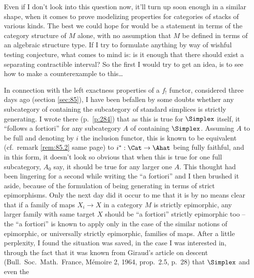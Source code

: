 Even if I don't look into this question now, it'll turn up soon enough
in a similar shape, when it comes to prove modelizing properties for
categories of stacks of various kinds. The best we could hope for
would be a statement in terms of the category structure of $M$ alone,
with no assumption that $M$ be defined in terms of an algebraic
structure type. If I try to formulate anything by way of wishful
testing conjecture, what comes to mind is: is it enough that there
should exist a separating contractible interval? So the first I would
try to get an idea, is to see how to make a counterexample to
this\ldots

\bigbreak
\presectionfill{}\par

\label{sec:89}%
In connection with the left exactness properties of a $f_!$ functor,
considered three days ago (section \ref{sec:85}), I have been befallen
by some doubts whether any subcategory of \Cat{} containing the
subcategory of standard simplices is strictly generating. I wrote
there (p.\ \ref{p:284}) that as this is true for $\Simplex$ itself, it
``follows a fortiori'' for any subcategory $A$ of \Cat{} containing
$\Simplex$. Assuming $A$ to be full and denoting by $i$ the inclusion
functor, this is known to be equivalent (cf.\ remark \ref{rem:85.2}
same page) to $i^*:\Cat\to\Ahat$ being fully faithful, and in this
form, it doesn't look so obvious that when this is true for one full
subcategory, $A_0$ say, it should be true for any larger one $A$. This
thought had been lingering for a second while writing the ``a
fortiori'' and I then brushed it aside, because of the formulation of
being generating in terms of strict epimorphisms. Only the next day
did it occur to me that it is by no means clear that if a family of
maps $X_i\to X$ in a category $M$ is strictly epimorphic, any larger
family with same target $X$ should be ``a fortiori'' strictly
epimorphic too -- the ``a fortiori'' is known to apply only in the
case of the similar notions of epimorphic, or universally strictly
epimorphic, families of maps. After a little perplexity, I found the
situation was saved, in the case I was interested in, through the fact
that it was known from Giraud's article on
descent (Bull.\ Soc.\ Math.\ France,
Mémoire 2, 1964, prop.\ 2.5, p.\ 28) that $\Simplex$ and even the
